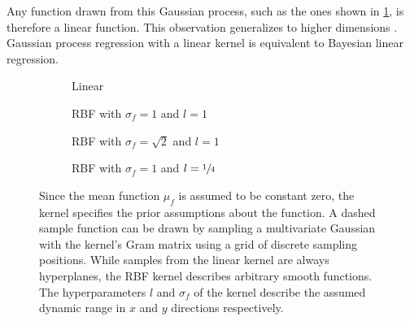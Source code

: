 Any function drawn from this Gaussian process, such as the ones shown in \cref{fig:gp_samples:linear}, is therefore a linear function.
This observation generalizes to higher dimensions \cite{rasmussen_gaussian_2006}.
Gaussian process regression with a linear kernel is equivalent to Bayesian linear regression.
\begin{figure}[p]
    \centering
    \begin{subfigure}[b]{\subfigurewidth}
        \centering
        \caption{Linear}
        \label{fig:gp_samples:linear}
    \end{subfigure}
    \begin{subfigure}[b]{\subfigurewidth}
        \centering
        \caption{RBF with $\sigma_f = 1$ and $l=1$}
        \label{fig:gp_samples:rbf_normal}
    \end{subfigure}

    \vspace{4ex}

    \begin{subfigure}[b]{\subfigurewidth}
        \centering
        \caption{RBF with $\sigma_f = \sqrt{2}$ and $l=1$}
        \label{fig:gp_samples:rbf_noisy}
    \end{subfigure}
    \begin{subfigure}[b]{\subfigurewidth}
        \centering
        \caption{RBF with $\sigma_f = 1$ and $l=\sfrac{1}{4}$}
        \label{fig:gp_samples:rbf_lengthscale}
    \end{subfigure}
    \caption[Samples from GP priors]{
        Since the mean function $\mu_f$ is assumed to be constant zero, the kernel specifies the prior assumptions about the function.
        A dashed sample function can be drawn by sampling a multivariate Gaussian with the kernel's Gram matrix using a grid of discrete sampling positions.
        While samples from the linear kernel are always hyperplanes, the RBF kernel describes arbitrary smooth functions.
        The hyperparameters $l$ and $\sigma_f$ of the kernel describe the assumed dynamic range in $x$ and $y$ directions respectively.
    }
    \label{fig:gp_samples}
\end{figure}

